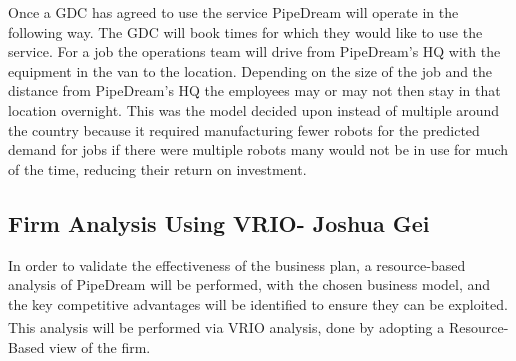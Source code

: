 \documentclass[11pt]{article}		%
\newcommand{\supercite}[1]{\textsuperscript{\cite{#1}}}		%
\begin{document}
	       Once a GDC has agreed to use the service PipeDream will operate in the following way.
	       The GDC will book times for which they would like to use the service. For a job the operations team will drive from PipeDream’s HQ with the equipment in the van to the location. Depending on the size of the job and the distance from PipeDream’s HQ the employees may or may not then stay in that location overnight. This was the model  decided upon instead of multiple around the country because it required manufacturing fewer robots for the predicted demand for jobs if there were multiple robots many would not be in use for much of the time, reducing their return on investment.%
    
    	\subsection[Firm Analysis Using VRIO]{Firm Analysis Using VRIO- Joshua Gei} \label{vrioAnalysisSection}
    	
	In order to validate the effectiveness of the business plan, a resource-based analysis of PipeDream will be performed, with the chosen business model, and the key competitive advantages will be identified to ensure they can be exploited. This analysis will be performed via VRIO analysis\supercite{VRIO}, done by adopting a Resource-Based view of the firm. 
	
	
\end{document}
